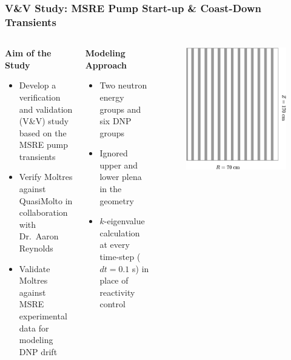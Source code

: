\begin{frame}
  \frametitle{V\&V Study: MSRE Pump Start-up \& Coast-Down Transients}
  \begin{columns}
    \column{6.5cm}
    \begin{block}{\textbf{Aim of the Study}}
      \begin{itemize}
         \item Develop a verification and validation (V\&V) study based on the MSRE pump transients
         \item Verify Moltres against QuasiMolto \cite{reynolds_analysis_2023} in collaboration
           with Dr.\ Aaron Reynolds
         \item Validate Moltres against MSRE experimental data for modeling \gls{DNP} drift
       \end{itemize}
    \end{block}
    \begin{block}{\textbf{Modeling Approach}}
      \begin{itemize}
        \item Two neutron energy groups and six DNP groups
        \item Ignored upper and lower plena in the geometry
        \item $k$-eigenvalue calculation at every time-step ($dt=0.1$ s) in place of reactivity control
      \end{itemize}
    \end{block}
    \column{4.5cm}
    \begin{figure}[htb]
      \centering
      \includegraphics[width=0.8\columnwidth]{images/msre-2d}

\end{figure}
\end{columns}
\end{frame}

